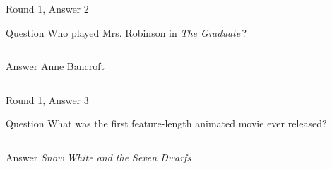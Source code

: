 \documentclass[11pt]{beamer}
\begin{document}
\begin{frame}[t]{Round 1, Answer 2}
  \vspace{2em}
  \begin{block}{Question}
    Who played Mrs. Robinson in \emph{The Graduate}\,?
  \end{block}
  \pause{}
  \begin{columns}[T,totalwidth=\linewidth]
    \begin{column}{0.35\linewidth}
      \begin{block}{Answer}
        Anne Bancroft
      \end{block}
    \end{column}
    \begin{column}{0.6\linewidth}
      \begin{center}
        \texttt{[image: \{Images/mrs\_robinson]}.jpeg}
      \end{center}
    \end{column}
  \end{columns}
\end{frame}


\begin{frame}[t]{Round 1, Answer 3}
  \vspace{2em}
  \begin{block}{Question}
    What was the first feature-length animated movie ever released?
  \end{block}
  \pause{}
  \begin{columns}[T,totalwidth=\linewidth]
    \begin{column}{0.35\linewidth}
      \begin{block}{Answer}
        \emph{Snow White and the Seven Dwarfs}
      \end{block}
    \end{column}
    \begin{column}{0.6\linewidth}
      \begin{center}
        \texttt{[image: \{Images/snowwhite]}.jpg}
      \end{center}
    \end{column}
  \end{columns}
\end{frame}
\end{document}
